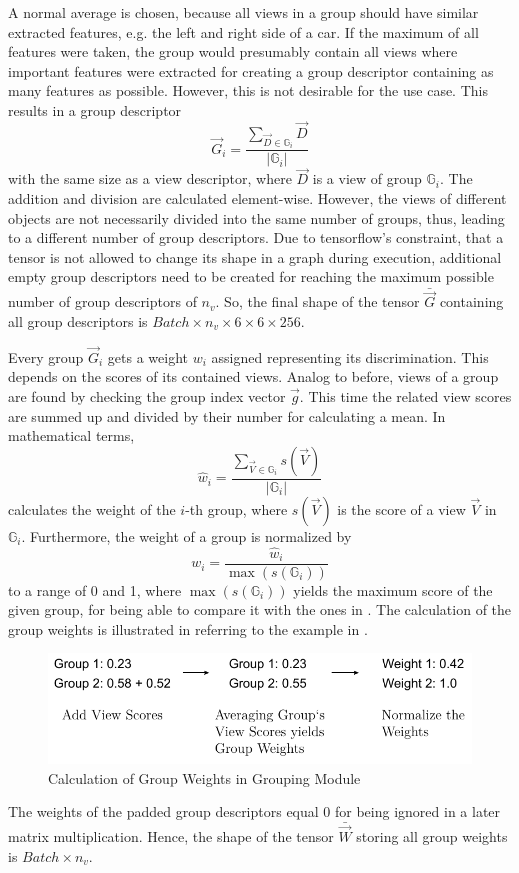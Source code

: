 A normal average is chosen, because all views in a group should have similar extracted features, e.g. the left and right side of a car.
If the maximum of all features were taken, the group would presumably contain all views where important features were extracted for creating a group descriptor containing as many features as possible.
However, this is not desirable for the use case.
This results in a group descriptor
\begin{equation}
	\vec{G}_i = \frac{\sum_{\vec{D} \in \mathbb{G}_i} \vec{D}}{|\mathbb{G}_i|}
\end{equation}
with the same size as a view descriptor, where $\vec{D}$ is a view of group $\mathbb{G}_i$. The addition and division are calculated element-wise.
However, the views of different objects are not necessarily divided into the same number of groups, thus, leading to a different number of group descriptors.
Due to tensorflow's constraint, that a tensor is not allowed to change its shape in a graph during execution, additional empty group descriptors need to be created for reaching the maximum possible number of group descriptors of $n_v$.
So, the final shape of the tensor $\bar{\vec{G}}$ containing all group descriptors is $Batch \times n_v \times 6 \times 6 \times 256$.

Every group $\vec{G}_i$ gets a weight $w_i$ assigned representing its discrimination.
This depends on the scores of its contained views.
Analog to before, views of a group are found by checking the group index vector $\vec{g}$.
This time the related view scores are summed up and divided by their number for calculating a mean.
In mathematical terms,
\begin{equation}
	\hat{w}_i = \frac{\sum_{\vec{V} \in \mathbb{G}_i} s(\vec{V})}{|\mathbb{G}_i|}
\end{equation}
calculates the weight of the $i$-th group, where $s(\vec{V})$ is the score of a view $\vec{V}$ in $\mathbb{G}_i$.
Furthermore, the weight of a group is normalized by
\begin{equation}
	w_i = \frac{\hat{w}_i}{\max(s(\mathbb{G}_i))}
\end{equation}
to a range of 0 and 1, where $\max(s(\mathbb{G}_i))$ yields the maximum score of the given group, for being able to compare it with the ones in \cite{Feng2018}.
The calculation of the group weights is illustrated in  referring to the example in .
\begin{figure}
	\centering
	\includegraphics[]{images/grouping_module_weights.pdf}
	\caption{Calculation of Group Weights in Grouping Module}
	\label{fig:grouping-module-weights}
\end{figure}
The weights of the padded group descriptors equal 0 for being ignored in a later matrix multiplication.
Hence, the shape of the tensor $\bar{\vec{W}}$ storing all group weights is $Batch \times n_v$.